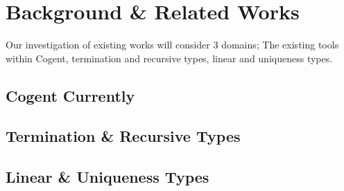 \chapter{Background \& Related Works}\label{ch:background}

Our investigation of existing works will consider 3 domains; The existing tools within Cogent,
termination and recursive types, linear and uniqueness types.

\section{Cogent Currently}

\section{Termination \& Recursive Types}

\section{Linear \& Uniqueness Types}